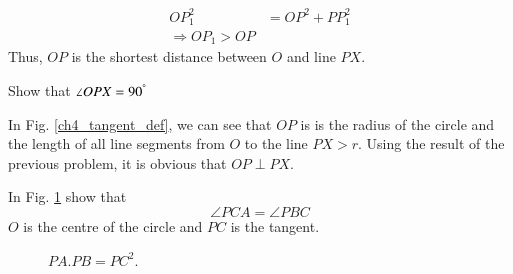 %
\begin{equation}
\begin{split}
OP_1^2 &= OP^2 + PP_1^2 \\
\Rightarrow OP_1 > OP
\end{split}
\end{equation}
%
Thus, $OP$ is the shortest distance between $O$ and line $PX$.
%
\begin{problem}
Show that $\angle OPX = 90 ^{\degree}$
\end{problem}
\proof In Fig. \ref{ch4_tangent_def}, we can see that $OP$ is is the radius of the circle and the length of all line segments from $O$ to the line $PX > r$.  Using the result of the previous 
problem, it is obvious that $OP \perp PX$. 
%
\begin{problem}
In Fig. \ref{ch4_tangent_prod} show that 
%
\begin{equation}
\angle PCA = \angle PBC
\end{equation}
%
$O$ is the centre of the circle and $PC$ is the tangent.
\end{problem}
	\begin{figure}[!h]
		\begin{center}
			
			\resizebox{\columnwidth}{!}{}
		\end{center}
		\caption{$PA.PB = PC^2$.}
		\label{ch4_tangent_prod}	
	\end{figure}

